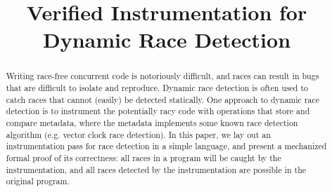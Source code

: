 \documentclass[preprint, 10pt]{sigplanconf}
\newcommand{\ignore}[1]{}
\begin{document}
\setlength{\pdfpageheight}{\paperheight}
\setlength{\pdfpagewidth}{\paperwidth}






\title{Verified Instrumentation for Dynamic Race Detection}
\ignore{\authorinfo{William Mansky \and Yuanfeng Peng \and Steve Zdancewic \and Joseph Devietti}
           {University of Pennsylvania}
           {wmansky@seas.upenn.edu, yuanfeng@cis.upenn.edu, stevez@cis.upenn.edu, devietti@cis.upenn.edu}}
\authorinfo{}{}{}
\maketitle

\begin{abstract}
Writing race-free concurrent code is notoriously difficult, and races can result in bugs that are difficult to isolate and reproduce. Dynamic race detection is often used to catch races that cannot (easily) be detected statically. One approach to dynamic race detection is to instrument the potentially racy code with operations that store and compare metadata, where the metadata implements some known race detection algorithm (e.g. vector clock race detection). In this paper, we lay out an instrumentation pass for race detection in a simple language, and present a mechanized formal proof of its correctness: all races in a program will be caught by the instrumentation, and all races detected by the instrumentation are possible in the original program.
\end{abstract}

\end{document}
